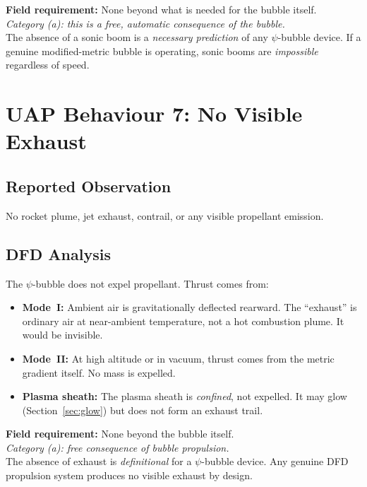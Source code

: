 \documentclass[12pt,a4paper]{article}
\begin{document}
\begin{tcolorbox}[colback=green!5!white, colframe=green!60!black,
  title=No Sonic Boom Assessment]
\textbf{Field requirement:} None beyond what is needed for the bubble itself.\\
\emph{Category (a): this is a free, automatic consequence of the bubble.}\\[4pt]
The absence of a sonic boom is a \emph{necessary prediction} of any
$\psi$-bubble device.  If a genuine modified-metric bubble is operating,
sonic booms are \emph{impossible} regardless of speed.
\end{tcolorbox}


\section{UAP Behaviour 7: No Visible Exhaust}\label{sec:exhaust}

\subsection{Reported Observation}

No rocket plume, jet exhaust, contrail, or any visible propellant
emission.

\subsection{DFD Analysis}

The $\psi$-bubble does not expel propellant.  Thrust comes from:
\begin{itemize}
\item \textbf{Mode~I:} Ambient air is gravitationally deflected
  rearward.  The ``exhaust'' is ordinary air at near-ambient temperature,
  not a hot combustion plume.  It would be invisible.
\item \textbf{Mode~II:} At high altitude or in vacuum, thrust comes
  from the metric gradient itself.  No mass is expelled.
\item \textbf{Plasma sheath:} The plasma sheath is \emph{confined}, not
  expelled.  It may glow (Section~\ref{sec:glow}) but does not form
  an exhaust trail.
\end{itemize}

\begin{tcolorbox}[colback=green!5!white, colframe=green!60!black,
  title=No Exhaust Assessment]
\textbf{Field requirement:} None beyond the bubble itself.\\
\emph{Category (a): free consequence of bubble propulsion.}\\[4pt]
The absence of exhaust is \emph{definitional} for a $\psi$-bubble device.
Any genuine DFD propulsion system produces no visible exhaust by design.
\end{tcolorbox}
\end{document}
